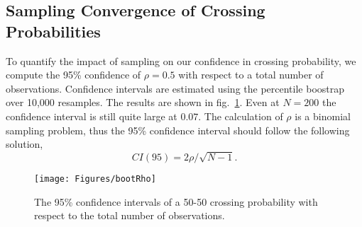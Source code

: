     \subsection{Sampling Convergence of Crossing Probabilities}
        \par To quantify the impact of sampling on our confidence in crossing probability, we compute the 95\% confidence of $\rho=0.5$ with respect to a total number of observations. Confidence intervals are estimated using the percentile boostrap over 10,000 resamples. The results are shown in fig.~\ref{fig:bootRho}. Even at $N=200$ the confidence interval is still quite large at $0.07$. The calculation of $\rho$ is a binomial sampling problem, thus the 95\% confidence interval should follow the following solution,
        \begin{equation}
            CI(95) = 2\rho/\sqrt{N-1}.
        \end{equation}

        \begin{figure}[!htbp]
        \begin{center}
            \texttt{[image: Figures/bootRho]}
            \caption{The 95\% confidence intervals of a 50-50 crossing probability with respect to the total number of observations.}
            \label{fig:bootRho}
        \end{center}
        \end{figure}
